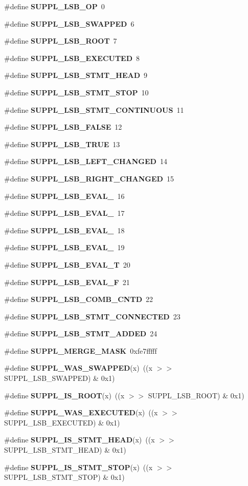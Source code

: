 \begin{CompactItemize}
\#define {\bf SUPPL\_\-LSB\_\-OP}\ 0
\item 
\#define {\bf SUPPL\_\-LSB\_\-SWAPPED}\ 6
\item 
\#define {\bf SUPPL\_\-LSB\_\-ROOT}\ 7
\item 
\#define {\bf SUPPL\_\-LSB\_\-EXECUTED}\ 8
\item 
\#define {\bf SUPPL\_\-LSB\_\-STMT\_\-HEAD}\ 9
\item 
\#define {\bf SUPPL\_\-LSB\_\-STMT\_\-STOP}\ 10
\item 
\#define {\bf SUPPL\_\-LSB\_\-STMT\_\-CONTINUOUS}\ 11
\item 
\#define {\bf SUPPL\_\-LSB\_\-FALSE}\ 12
\item 
\#define {\bf SUPPL\_\-LSB\_\-TRUE}\ 13
\item 
\#define {\bf SUPPL\_\-LSB\_\-LEFT\_\-CHANGED}\ 14
\item 
\#define {\bf SUPPL\_\-LSB\_\-RIGHT\_\-CHANGED}\ 15
\item 
\#define {\bf SUPPL\_\-LSB\_\-EVAL\_}\ 16
\item 
\#define {\bf SUPPL\_\-LSB\_\-EVAL\_}\ 17
\item 
\#define {\bf SUPPL\_\-LSB\_\-EVAL\_}\ 18
\item 
\#define {\bf SUPPL\_\-LSB\_\-EVAL\_}\ 19
\item 
\#define {\bf SUPPL\_\-LSB\_\-EVAL\_\-T}\ 20
\item 
\#define {\bf SUPPL\_\-LSB\_\-EVAL\_\-F}\ 21
\item 
\#define {\bf SUPPL\_\-LSB\_\-COMB\_\-CNTD}\ 22
\item 
\#define {\bf SUPPL\_\-LSB\_\-STMT\_\-CONNECTED}\ 23
\item 
\#define {\bf SUPPL\_\-LSB\_\-STMT\_\-ADDED}\ 24
\item 
\#define {\bf SUPPL\_\-MERGE\_\-MASK}\ 0xfe7fffff
\item 
\#define {\bf SUPPL\_\-WAS\_\-SWAPPED}(x)\ ((x $>$$>$ SUPPL\_\-LSB\_\-SWAPPED) \& 0x1)
\item 
\#define {\bf SUPPL\_\-IS\_\-ROOT}(x)\ ((x $>$$>$ SUPPL\_\-LSB\_\-ROOT) \& 0x1)
\item 
\#define {\bf SUPPL\_\-WAS\_\-EXECUTED}(x)\ ((x $>$$>$ SUPPL\_\-LSB\_\-EXECUTED) \& 0x1)
\item 
\#define {\bf SUPPL\_\-IS\_\-STMT\_\-HEAD}(x)\ ((x $>$$>$ SUPPL\_\-LSB\_\-STMT\_\-HEAD) \& 0x1)
\item 
\#define {\bf SUPPL\_\-IS\_\-STMT\_\-STOP}(x)\ ((x $>$$>$ SUPPL\_\-LSB\_\-STMT\_\-STOP) \& 0x1)
\item 
$$
\end{CompactItemize}
